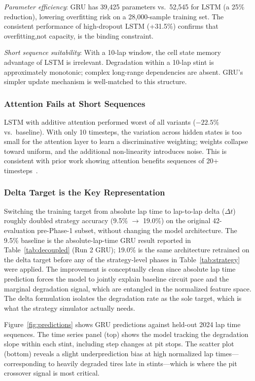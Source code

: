 \textit{Parameter efficiency}: GRU has 39{,}425 parameters vs.\ 52{,}545 for LSTM (a 25\% reduction), lowering overfitting risk on a 28,000-sample training set. The consistent performance of high-dropout LSTM (+31.5\%) confirms that overfitting,not capacity, is the binding constraint.

\textit{Short sequence suitability}: With a 10-lap window, the cell state memory advantage of LSTM is irrelevant. Degradation within a 10-lap stint is approximately monotonic; complex long-range dependencies are absent. GRU's simpler update mechanism is well-matched to this structure.

\subsubsection{Attention Fails at Short Sequences}

LSTM with additive attention performed worst of all variants ($-22.5\%$ vs.\ baseline). With only 10 timesteps, the variation across hidden states is too small for the attention layer to learn a discriminative weighting; weights collapse toward uniform, and the additional non-linearity introduces noise. This is consistent with prior work showing attention benefits sequences of 20+ timesteps~\cite{bahdanau2015}.

\subsubsection{Delta Target is the Key Representation}

Switching the training target from absolute lap time to lap-to-lap delta ($\Delta t$) roughly doubled strategy accuracy (9.5\% $\to$ 19.0\%) on the original 42-evaluation pre-Phase-1 subset, without changing the model architecture. The 9.5\% baseline is the absolute-lap-time GRU result reported in Table~\ref{tab:decoupled} (Run 2 GRU); 19.0\% is the same architecture retrained on the delta target before any of the strategy-level phases in Table~\ref{tab:strategy} were applied. The improvement is conceptually clean since absolute lap time prediction forces the model to jointly explain baseline circuit pace and the marginal degradation signal, which are entangled in the normalized feature space. The delta formulation isolates the degradation rate as the sole target, which is what the strategy simulator actually needs.

Figure~\ref{fig:predictions} shows GRU predictions against held-out 2024 lap time sequences. The time series panel (top) shows the model tracking the degradation slope within each stint, including step changes at pit stops. The scatter plot (bottom) reveals a slight underprediction bias at high normalized lap times---corresponding to heavily degraded tires late in stints---which is where the pit crossover signal is most critical.

